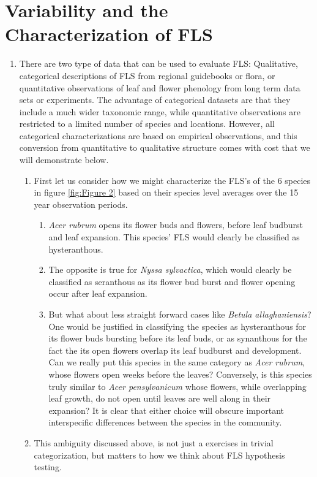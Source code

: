 \documentclass{article}
\begin{document}
\section{Variability and the Characterization of FLS}
\begin{enumerate}
\item There are two type of data that can be used to evaluate FLS: Qualitative, categorical descriptions of FLS from regional guidebooks or flora, or quantitative observations of leaf and flower phenology from long term data sets or experiments. The advantage of categorical datasets are that they include a much wider taxonomic range, while quantitative observations are restricted to a limited number of species and locations.  However, all categorical characterizations are based on empirical observations, and this conversion from quantitative to qualitative structure comes with cost that we will demonstrate below.
\begin{enumerate}
    \item First let us consider how we might characterize the FLS's of the 6 species in figure \ref{fig:Figure 2} based on their species level averages over the 15 year observation periods. 
    \begin{enumerate}
    \item \textit{Acer rubrum} opens its flower buds and flowers, before leaf budburst and leaf expansion. This species' FLS would clearly be classified as hysteranthous.
    \item  The opposite is true for \textit{Nyssa sylvactica}, which would clearly be classified as seranthous as its flower bud burst and flower opening occur after leaf expansion.
    \item But what about less straight forward cases like \textit{Betula allaghaniensis}? One would be justified in classifying the species as hysteranthous for its flower buds bursting before its leaf buds, or as synanthous for the fact the its open flowers overlap its leaf budburst and development. Can we really put this species in the same category as \textit{Acer rubrum}, whose flowers open weeks before the leaves? Conversely, is this species truly similar to \textit{Acer pensylvanicum} whose flowers, while overlapping leaf growth, do not open until leaves are well along in their expansion? It is clear that either choice will obscure important interspecific differences between the species in the community.
    \end{enumerate}
 \item This ambiguity discussed above, is not just a exercises in trivial categorization, but matters to how we think about FLS hypothesis testing.

\end{enumerate}
\end{enumerate}
\end{document}
